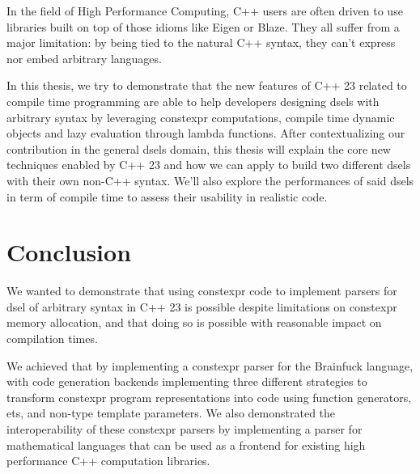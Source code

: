 \documentclass[english,12pt,a4paper]{book}
\providecommand{\cpp}{\textsc{C++}\xspace}
\begin{document}
In the field of High Performance Computing, \cpp users are often driven to use
libraries built on top of those idioms like Eigen\cite{eigen} or
Blaze\cite{blazelib,iglberger2012_2}. They all suffer from a major limitation:
by being tied to the natural \cpp syntax, they can't express nor embed arbitrary
languages.

In this thesis, we try to demonstrate that the new features of \cpp23 related to
compile time programming are able to help developers designing \glspl{dsel} with
arbitrary syntax by leveraging \gls{constexpr} computations, compile time dynamic
objects and lazy evaluation through lambda functions. After contextualizing our
contribution in the general \glspl{dsel} domain, this thesis will explain the core
new techniques enabled by \cpp23 and how we can apply to build two different
\glspl{dsel} with their own non-\cpp syntax. We'll also explore the performances of
said \glspl{dsel} in term of compile time to assess their usability in realistic code.






\section{Conclusion}


We wanted to demonstrate that using \gls{constexpr} code to implement parsers for
\gls{dsel} of arbitrary syntax in \cpp23 is possible despite limitations on
\gls{constexpr} memory allocation, and that doing so is possible with reasonable
impact on compilation times.

We achieved that by implementing a \gls{constexpr} parser for the Brainfuck language,
with code generation backends implementing three different strategies to
transform \gls{constexpr} program representations into code using function
generators, \glspl{et}, and non-type template parameters.
We also demonstrated the interoperability of these \gls{constexpr} parsers by
implementing a parser for mathematical languages that can be used as a frontend
for existing high performance \cpp computation libraries.
\end{document}
